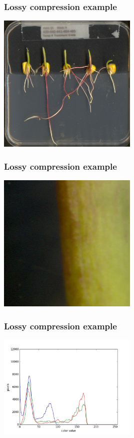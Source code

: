 \documentclass{beamer}
\begin{document}
\begin{frame}
	\frametitle{Lossy compression example}

	\begin{center}
	\includegraphics[width=0.5\textwidth]{../../fig/01-quality-orig.jpg}
	\end{center}

\end{frame}

\begin{frame}
	\frametitle{Lossy compression example}

	\begin{center}
	\includegraphics[width=0.5\textwidth]{../../fig/01-quality-tif.jpg}
	\end{center}

\end{frame}

\begin{frame}
	\frametitle{Lossy compression example}

	\begin{center}
	\includegraphics[width=0.5\textwidth]{../../fig/01-quality-tif-histogram.jpeg}
	\end{center}

\end{frame}
\end{document}
